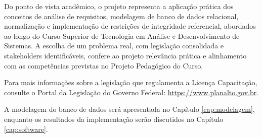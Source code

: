 Do ponto de vista acadêmico, o projeto representa a aplicação prática dos conceitos de análise de requisitos, modelagem de banco de dados relacional, normalização e implementação de restrições de integridade referencial, abordados ao longo do Curso Superior de Tecnologia em Análise e Desenvolvimento de Sistemas. A escolha de um problema real, com legislação consolidada e stakeholders identificáveis, confere ao projeto relevância prática e alinhamento com as competências previstas no Projeto Pedagógico do Curso.

Para mais informações sobre a legislação que regulamenta a Licença Capacitação, consulte o Portal da Legislação do Governo Federal: \url{https://www.planalto.gov.br}.

A modelagem do banco de dados será apresentada no Capítulo \ref{cap:modelagem}, enquanto os resultados da implementação serão discutidos no Capítulo \ref{cap:software}.